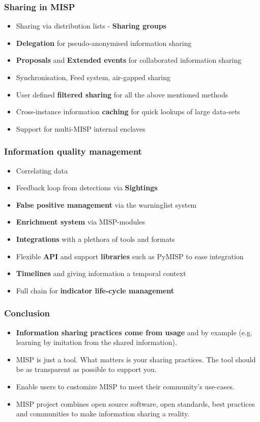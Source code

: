 \begin{frame}
\frametitle{Sharing in MISP}
    \begin{itemize}
        \item Sharing via distribution lists - {\bf Sharing groups}
        \item {\bf Delegation} for pseudo-anonymised information sharing
        \item {\bf Proposals} and {\bf Extended events} for collaborated information sharing
        \item Synchronisation, Feed system, air-gapped sharing
        \item User defined {\bf filtered sharing} for all the above mentioned methods
        \item Cross-instance information {\bf caching} for quick lookups of large data-sets
        \item Support for multi-MISP internal enclaves
    \end{itemize}
\end{frame}

\begin{frame}
\frametitle{Information quality management}
    \begin{itemize}
        \item Correlating data
        \item Feedback loop from detections via {\bf Sightings}
        \item {\bf False positive management} via the warninglist system
        \item {\bf Enrichment system} via MISP-modules
        \item {\bf Integrations} with a plethora of tools and formats
        \item Flexible {\bf API} and support {\bf libraries} such as PyMISP to ease integration
        \item {\bf Timelines} and giving information a temporal context
        \item Full chain for {\bf indicator life-cycle management}
    \end{itemize}
\end{frame}

\begin{frame}
        \frametitle{Conclusion}
        \begin{itemize}
                \item {\bf Information sharing practices come from usage} and by example (e.g. learning by imitation from the shared information).
                \item MISP is just a tool. What matters is your sharing practices. The tool should be as transparent as possible to support you.
                \item Enable users to customize MISP to meet their community's use-cases.
                \item MISP project combines open source software, open standards, best practices and communities to make information sharing a reality.
        \end{itemize}
\end{frame}


